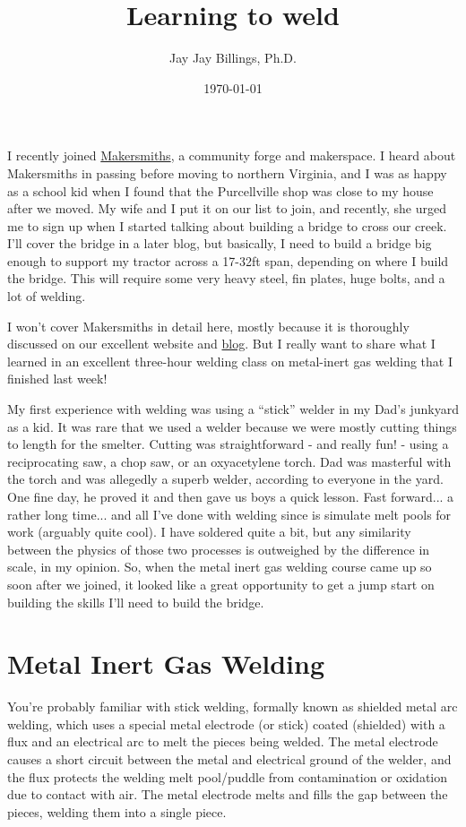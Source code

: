 \documentclass{article}
\title{Learning to weld}
\author{Jay Jay Billings, Ph.D.}
\date{\today}
\begin{document}
\maketitle

I recently joined \href{https://makersmiths.org/}{Makersmiths}, a community forge and makerspace. I heard about Makersmiths in passing before moving to northern Virginia, and I was as happy as a school kid when I found that the Purcellville shop was close to my house after we moved. My wife and I put it on our list to join, and recently, she urged me to sign up when I started talking about building a bridge to cross our creek. I'll cover the bridge in a later blog, but basically, I need to build a bridge big enough to support my tractor across a 17-32ft span, depending on where I build the bridge. This will require some very heavy steel, fin plates, huge bolts, and a lot of welding.

I won't cover Makersmiths in detail here, mostly because it is thoroughly discussed on our excellent website and \href{https://makersmiths.org/Blog}{blog}. But I really want to share what I learned in an excellent three-hour welding class on metal-inert gas welding that I finished last week! 

My first experience with welding was using a ``stick'' welder in my Dad's junkyard as a kid. It was rare that we used a welder because we were mostly cutting things to length for the smelter. Cutting was straightforward - and really fun! - using a reciprocating saw, a chop saw, or an oxyacetylene torch. Dad was masterful with the torch and was allegedly a superb welder, according to everyone in the yard. One fine day, he proved it and then gave us boys a quick lesson. Fast forward... a rather long time... and all I've done with welding since is simulate melt pools for work (arguably quite cool). I have soldered quite a bit, but any similarity between the physics of those two processes is outweighed by the difference in scale, in my opinion. So, when the metal inert gas welding course came up so soon after we joined, it looked like a great opportunity to get a jump start on building the skills I'll need to build the bridge.

\section*{Metal Inert Gas Welding}

You're probably familiar with stick welding, formally known as shielded metal arc welding, which uses a special metal electrode (or stick) coated (shielded) with a flux and an electrical arc to melt the pieces being welded. The metal electrode causes a short circuit between the metal and electrical ground of the welder, and the flux protects the welding melt pool/puddle from contamination or oxidation due to contact with air. The metal electrode melts and fills the gap between the pieces, welding them into a single piece.
\end{document}
